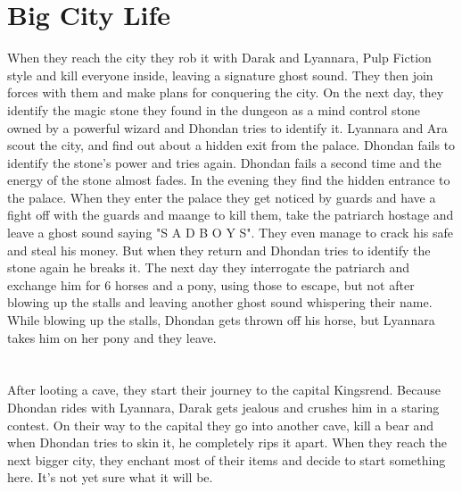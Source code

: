 \documentclass[oneside]{book}
\begin{document}
\chapter{Big City Life}
When they reach the city they rob it with Darak and Lyannara, Pulp Fiction style and kill everyone inside, leaving a signature ghost sound.
They then join forces with them and make plans for conquering the city.
On the next day, they identify the magic stone they found in the dungeon as a mind control stone owned by a powerful wizard and Dhondan tries to identify it.
Lyannara and Ara scout the city, and find out about a hidden exit from the palace. Dhondan fails to identify the stone's power and tries again.
Dhondan fails a second time and the energy of the stone almost fades. In the evening they find the hidden entrance to the palace.
When they enter the palace they get noticed by guards and have a fight off with the guards and maange to kill them, take the patriarch hostage and leave a ghost sound saying "S A D B O Y S".
They even manage to crack his safe and steal his money. But when they return and Dhondan tries to identify the stone again he breaks it.
The next day they interrogate the patriarch and exchange him for 6 horses and a pony, using those to escape, but not after blowing up the stalls and leaving another ghost sound whispering their name.
While blowing up the stalls, Dhondan gets thrown off his horse, but Lyannara takes him on her pony and they leave.
\chapter{}
After looting a cave, they start their journey to the capital Kingsrend. Because Dhondan rides with Lyannara, Darak gets jealous and crushes him in a staring contest.
On their way to the capital they go into another cave, kill a bear and when Dhondan tries to skin it, he completely rips it apart.
When they reach the next bigger city, they enchant most of their items and decide to start something here. It's not yet sure what it will be.
\end{document}
